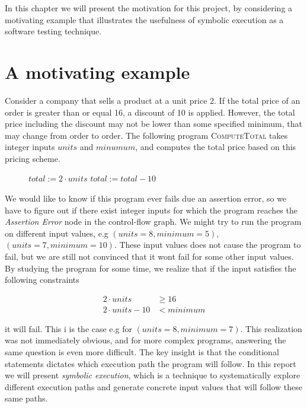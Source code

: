 In this chapter we will present the motivation for this project, by considering a motivating example that illustrates the usefulness of symbolic execution as a software testing technique.

\section{A motivating example}
Consider a company that sells a product at a unit price 2. If the total price of an order is greater than or equal 16, a discount of 10 is applied. However, the total price including the discount may not be lower than some specified minimum, that may change from order to order. The following program \textsc{ComputeTotal} takes integer inputs $units$ and $minumum$, and computes the total price based on this pricing scheme.
\begin{figure}[!h]
	\begin{algorithmic}[1]
		\State $total := 2\cdot units$
		\State $total := total - 10$
		\EndIf
		\State {}
		\EndProcedure
	\end{algorithmic}
\end{figure}

\motexample

\newpage

We would like to know if this program ever fails due an assertion error, so we have to figure out if there exist integer inputs for which the program reaches the \textsl{Assertion Error} node in the control-flow graph. 
We might try to run the program on different input values, e.g $(units = 8, minimum = 5)$, $(units = 7, minimum = 10)$. These input values does not cause the program to fail, but we are still not convinced that it wont fail for some other input values.
By studying the program for some time, we realize that if the input satisfies the following constraints

\begin{align*}
	 2\cdot units  & \geq 16\\
	 2 \cdot units - 10 & < minimum
\end{align*}

it will fail. This i is the case e.g for $(units = 8, minimum = 7)$. This realization was not immediately obvious, and for more complex programs, answering the same question is even more difficult. The key insight is that the conditional statements dictates which execution path the program will follow. In this report we will present \emph{symbolic execution}, which is a technique to systematically explore different execution paths and generate concrete input values that will follow these same paths. 